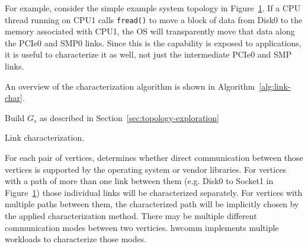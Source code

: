 \begin{figure}
    \centering
    \caption[A simple example topology]{}
    \label{fig:simple-topology}
\end{figure}

For example, consider the simple example system topology in Figure~\ref{fig:simple-topology}.
If a CPU thread running on CPU1 calls \texttt{fread()} to move a block of data from Disk0 to the memory associated with CPU1, the OS will transparently move that data along the PCIe0 and SMP0 links.
Since this is the capability is exposed to applications, it is useful to characterize it as well, not just the intermediate PCIe0 and SMP links.

An overview of the characterization algorithm is shown in Algorithm~\ref{alg:link-char}.

\begin{algorithm}[ht]
    \SetAlgoLined
     Build $G_s$ as described in Section~\ref{sec:topology-exploration}\;
     \caption{Link characterization.}
     \label{alg:link-char}
\end{algorithm}

For each pair of vertices,  determines whether direct communication between those vertices is supported by the operating system or vendor libraries.
For vertices with a path of more than one link between them (e.g. Disk0 to Socket1 in Figure~\ref{fig:simple-topology}) those individual links will be characterized separately.
For vertices with multiple paths between them, the characterized path will be implicitly chosen by the applied characterization method.
There may be multiple different communication modes between two verticies.
hwcomm implements multiple workloads to characterize those modes.

